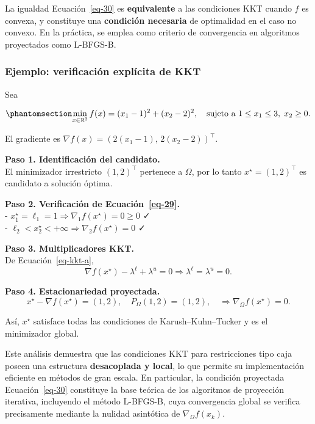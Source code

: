 \documentclass[
  spanish,
  us-letterpaper,
]{scrreprt}
\numberwithin{equation}{section}
\begin{document}
La igualdad Ecuación~\ref{eq-30} es \textbf{equivalente} a las
condiciones KKT cuando \(f\) es convexa, y constituye una
\textbf{condición necesaria} de optimalidad en el caso no convexo. En la
práctica, se emplea como criterio de convergencia en algoritmos
proyectados como L-BFGS-B.

\subsubsection{Ejemplo: verificación explícita de
KKT}\label{ejemplo-verificaciuxf3n-expluxedcita-de-kkt}

Sea

\begin{equation}\phantomsection\label{eq-31}{
\min_{x \in \mathbb{R}^2} f(x) = (x_1 - 1)^2 + (x_2 - 2)^2,
\quad
\text{sujeto a } 1 \le x_1 \le 3,\; x_2 \ge 0.
}\end{equation}

El gradiente es \(\nabla f(x) = (2(x_1 - 1),\, 2(x_2 - 2))^\top\).

\textbf{Paso 1. Identificación del candidato.}\\
El minimizador irrestricto \((1,2)^\top\) pertenece a \(\Omega\), por lo
tanto \(x^\star = (1,2)^\top\) es candidato a solución óptima.

\textbf{Paso 2. Verificación de Ecuación~\ref{eq-29}.}\\
- \(x_1^\star = \ell_1 = 1 \Rightarrow \nabla_1 f(x^\star) = 0 \ge 0\)
✓\\
- \(\ell_2 < x_2^\star < +\infty \Rightarrow \nabla_2 f(x^\star) = 0\) ✓

\textbf{Paso 3. Multiplicadores KKT.}\\
De Ecuación~\ref{eq-kkt-a}, \[
\nabla f(x^\star) - \lambda^\ell + \lambda^u = 0
\Rightarrow \lambda^\ell = \lambda^u = 0.
\]

\textbf{Paso 4. Estacionariedad proyectada.}\\
\[
x^\star - \nabla f(x^\star) = (1,2),\quad
P_\Omega(1,2) = (1,2),
\quad \Rightarrow \nabla_\Omega f(x^\star) = 0.
\]

Así, \(x^\star\) satisface todas las condiciones de Karush--Kuhn--Tucker
y es el minimizador global.

Este análisis demuestra que las condiciones KKT para restricciones tipo
caja poseen una estructura \textbf{desacoplada y local}, lo que permite
su implementación eficiente en métodos de gran escala. En particular, la
condición proyectada Ecuación~\ref{eq-30} constituye la base teórica de
los algoritmos de proyección iterativa, incluyendo el método L-BFGS-B,
cuya convergencia global se verifica precisamente mediante la nulidad
asintótica de \(\nabla_\Omega f(x_k)\).
\end{document}
